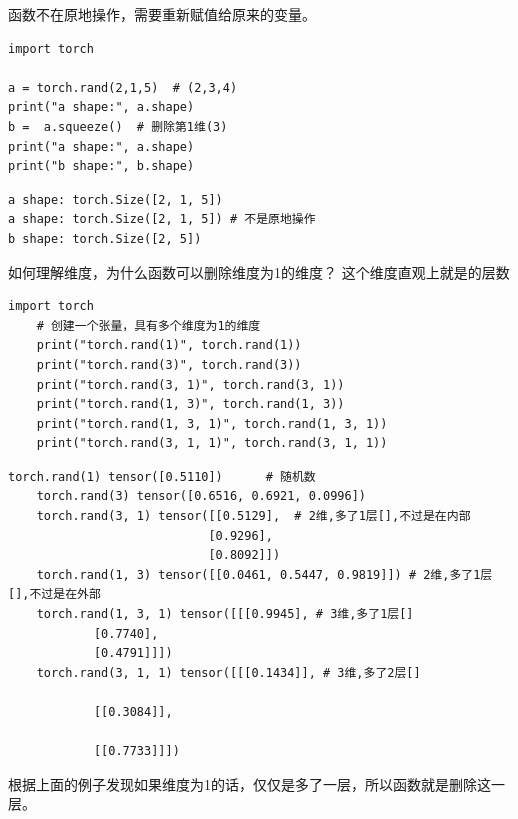 函数不在原地操作，需要重新赋值给原来的变量。
\begin{lstlisting}[style=pythonstyle]
import torch

a = torch.rand(2,1,5)  # (2,3,4)
print("a shape:", a.shape)
b =  a.squeeze()  # 删除第1维(3)
print("a shape:", a.shape)
print("b shape:", b.shape)
\end{lstlisting}
\begin{lstlisting}[style=demostyle,numbers=none]
a shape: torch.Size([2, 1, 5])
a shape: torch.Size([2, 1, 5]) # 不是原地操作
b shape: torch.Size([2, 5])
\end{lstlisting}

\begin{example}
    \exProblem
    如何理解维度，为什么函数可以删除维度为1的维度？
    \exSolution
    这个维度直观上就是\codeinline{[]}的层数
    \begin{lstlisting}[style=pythonstyle]
    import torch
    # 创建一个张量，具有多个维度为1的维度
    print("torch.rand(1)", torch.rand(1))
    print("torch.rand(3)", torch.rand(3))
    print("torch.rand(3, 1)", torch.rand(3, 1))
    print("torch.rand(1, 3)", torch.rand(1, 3))
    print("torch.rand(1, 3, 1)", torch.rand(1, 3, 1))
    print("torch.rand(3, 1, 1)", torch.rand(3, 1, 1))
    \end{lstlisting}
    \begin{lstlisting}[style=demostyle,numbers=none]
    torch.rand(1) tensor([0.5110])      # 随机数    
    torch.rand(3) tensor([0.6516, 0.6921, 0.0996]) 
    torch.rand(3, 1) tensor([[0.5129],  # 2维,多了1层[],不过是在内部
                            [0.9296],
                            [0.8092]])
    torch.rand(1, 3) tensor([[0.0461, 0.5447, 0.9819]]) # 2维,多了1层[],不过是在外部
    torch.rand(1, 3, 1) tensor([[[0.9945], # 3维,多了1层[]
            [0.7740],
            [0.4791]]])
    torch.rand(3, 1, 1) tensor([[[0.1434]], # 3维,多了2层[]

            [[0.3084]],

            [[0.7733]]])
    \end{lstlisting}    

    根据上面的例子发现如果维度为1的话，仅仅是多了一层\codeinline{[]}，所以函数就是删除这一层\codeinline{[]}。
\end{example}



